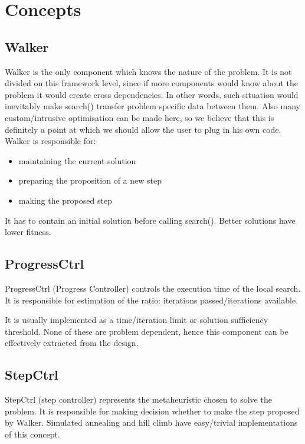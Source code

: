 \section{Concepts}

\subsection{Walker}

Walker is the only component which knows the nature of the problem.
It is not divided on this framework level, since if more components would know about the problem it would create cross dependencies.
In other words, such situation would inevitably make search() transfer problem specific data between them.
Also many custom/intrusive optimisation can be made here,
so we believe that this is definitely a point at which we should allow the user to plug in his own code. \\
Walker is responsible for:
\begin{itemize}
\item maintaining the current solution
\item preparing the proposition of a new step
\item making the proposed step
\end{itemize}
It has to contain an initial solution before calling search().
Better solutions have lower fitness.

\subsection{ProgressCtrl}

ProgressCtrl (Progress Controller) controls the execution time of the
local search. It is responsible for estimation of the ratio: iterations
passed/iterations available.

It is usually implemented as a time/iteration limit or solution sufficiency threshold.
None of these are problem dependent, hence this component can be effectively extracted from the design.

\subsection{StepCtrl}

StepCtrl (step controller) represents the metaheuristic chosen to
solve the problem. It is responsible for making decision whether to
make the step proposed by Walker.
Simulated annealing and hill climb have easy/trivial implementations of this concept.


